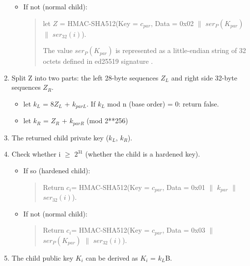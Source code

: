 \begin{adjustwidth}{0.5cm}{}
\begin{enumerate}
\begin{itemize}
\begin{quote}
                        \end{quote}

                  \item If not (normal child):
                        \begin{quote}
                            let $Z$ = HMAC-SHA512(Key = $c_{par}$, Data = 0x02 $\parallel$ $ser_{P}(K_{par})$ $\parallel$ $ser_{32}(i)$).

                            The value $ser_P(K_{par})$ is represented as a little-endian string of 32 octets defined in ed25519 signature \cite{DBLP:journals/rfc/rfc8032}.

                        \end{quote}
              \end{itemize}
              \bigskip

        \item Split Z into two parts: the left 28-byte sequences $Z_L$ and right side 32-byte sequences $Z_R$.
              \begin{itemize}
                  \item let $k_L$ = 8$Z_L$ +  $k_{parL}$. If $k_L$ mod n (base order) = 0: return false.

                  \item let  $k_R$ = $Z_R$ +  $k_{parR}$ (mod 2**256)

              \end{itemize}
              \bigskip

        \item The returned child private key ($k_L$, $k_R$).

              \bigskip
        \item Check whether i $\geq$ $2^{31}$ (whether the child is a hardened key).
              \begin{itemize}
                  \item If so (hardened child):
                        \begin{quote}
                            Return  $c_i$= HMAC-SHA512(Key = $c_{par}$, Data = 0x01 $\parallel$ $k_{par}$ $\parallel$ $ser_{32}(i)$).
                        \end{quote}
                  \item If not (normal child):
                        \begin{quote}
                            Return  $c_i$= HMAC-SHA512(Key = $c_{par}$, Data = 0x03 $\parallel$ $ser_P(K_{par})$ $\parallel$ $ser_{32}(i)$).
                        \end{quote}
              \end{itemize}
              \bigskip
        \item The child public key $K_i$ can be derived as $K_i$ = $k_L$B.


\end{enumerate}
\end{adjustwidth}
